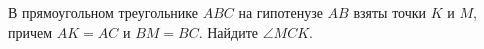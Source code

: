 \begin{ex}
	\begin{condition}
		В прямоугольном треугольнике \( ABC \) на гипотенузе \( AB \) взяты точки \( K \) и \( M \), причем \( AK = AC \) и \( BM = BC \). Найдите \( \angle MCK \).
	\end{condition}
\end{ex}